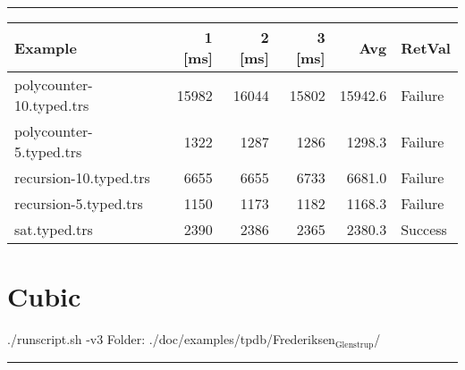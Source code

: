 \documentclass[11pt]{article}
\begin{document}
\rule{\linewidth}{0.5pt}

\begin{center}
\begin{tabular}{lrrrrl}
Example & 1 [ms] & 2 [ms] & 3 [ms] & Avg & RetVal\\
\hline
polycounter-10.typed.trs & 15982 & 16044 & 15802 & 15942.6 & Failure\\
polycounter-5.typed.trs & 1322 & 1287 & 1286 & 1298.3 & Failure\\
recursion-10.typed.trs & 6655 & 6655 & 6733 & 6681.0 & Failure\\
recursion-5.typed.trs & 1150 & 1173 & 1182 & 1168.3 & Failure\\
sat.typed.trs & 2390 & 2386 & 2365 & 2380.3 & Success\\
\end{tabular}

\end{center}


\section{Cubic}
\label{sec:org88a3ca5}

./runscript.sh -v3
Folder: ./doc/examples/tpdb/Frederiksen\(_{\text{Glenstrup}}\)/

\rule{\linewidth}{0.5pt}
\end{document}
